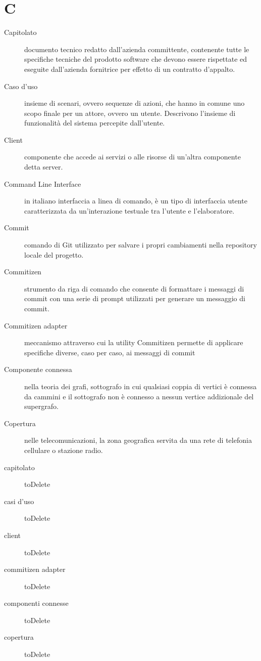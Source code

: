 \documentclass{article}
\begin{document}
  \section{C}
  \begin{description}
    \item[Capitolato] documento tecnico redatto dall'azienda committente, contenente tutte le specifiche tecniche del prodotto software che devono essere rispettate ed eseguite dall'azienda fornitrice per effetto di un contratto d'appalto.
    \item[Caso d'uso] insieme di scenari, ovvero sequenze di azioni, che hanno in comune uno scopo finale per un attore, ovvero un utente. Descrivono l'insieme di funzionalità del sistema percepite dall'utente.
    \item[Client] componente che accede ai servizi o alle risorse di un'altra componente detta server.
    \item[Command Line Interface] in italiano interfaccia a linea di comando, è un tipo di interfaccia utente caratterizzata da un'interazione testuale tra l'utente e l'elaboratore.
    \item[Commit] comando di Git utilizzato per salvare i propri cambiamenti nella repository locale del progetto.
    \item[Commitizen] strumento da riga di comando che consente di formattare i messaggi di commit con una serie di prompt utilizzati per generare un messaggio di commit.
    \item[Commitizen adapter] meccanismo attraverso cui la utility Commitizen permette di applicare specifiche diverse, caso per caso, ai messaggi di commit
    \item[Componente connessa] nella teoria dei grafi, sottografo in cui qualsiasi coppia di vertici è connessa da cammini e il sottografo non è connesso a nessun vertice addizionale del supergrafo.
    \item[Copertura] nelle telecomunicazioni, la zona geografica servita da una rete di telefonia cellulare o stazione radio.
    \item[capitolato] toDelete
    \item[casi d'uso] toDelete
    \item[client] toDelete
    \item[commitizen adapter] toDelete
    \item[componenti connesse] toDelete
    \item[copertura] toDelete
	\end{description}
\end{document}
